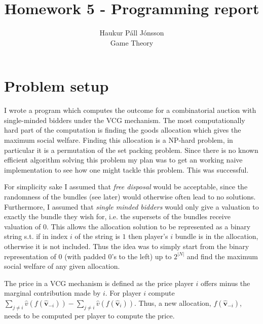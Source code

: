 \documentclass[12pt]{article}
\begin{document}
\let\oldsum\sum
\renewcommand{\sum}[3]{\oldsum\limits_{#1}^{#2}#3}
\let\oldprod\prod
\renewcommand{\prod}[3]{\oldprod\limits_{#1}^{#2}#3}

\title{Homework 5 - Programming report}
\author{Haukur Páll Jónsson\\
Game Theory}

\maketitle

\section{Problem setup}
I wrote a program which computes the outcome for a combinatorial auction with single-minded bidders under the VCG mechanism. The most computationally hard part of the computation is finding the goods allocation which gives the maximum social welfare. Finding this allocation is a NP-hard problem, in particular it is a permutation of the set packing problem. Since there is no known efficient algorithm solving this problem my plan was to get an working naive implementation to see how one might tackle this problem. This was successful.

For simplicity sake I assumed that \textit{free disposal} would be acceptable, since the randomness of the bundles (see later) would otherwise often lead to no solutions. Furthermore, I assumed that \textit{single minded bidders} would only give a valuation to exactly the bundle they wish for, i.e. the supersets of the bundles receive valuation of $0$. This allows the allocation solution to be represented as a binary string s.t. if in index $i$ of the string is $1$ then player's $i$ bundle is in the allocation, otherwise it is not included. Thus the idea was to simply start from the binary representation of $0$ (with padded $0$'s to the left) up to $2^|N|$ and find the maximum social welfare of any given allocation.

The price in a VCG mechanism is defined as the price player $i$ offers minus the marginal contribution made by $i$. For player $i$ compute $\sum{j \neq i}{}{\hat{v}(f(\boldsymbol{\hat{v}}_{-i}))} - \sum{j \neq i}{}{\hat{v}(f(\boldsymbol{\hat{v}}_{i}))}$. Thus, a new allocation, $f(\boldsymbol{\hat{v}}_{-i})$, needs to be computed per player to compute the price.
\end{document}
